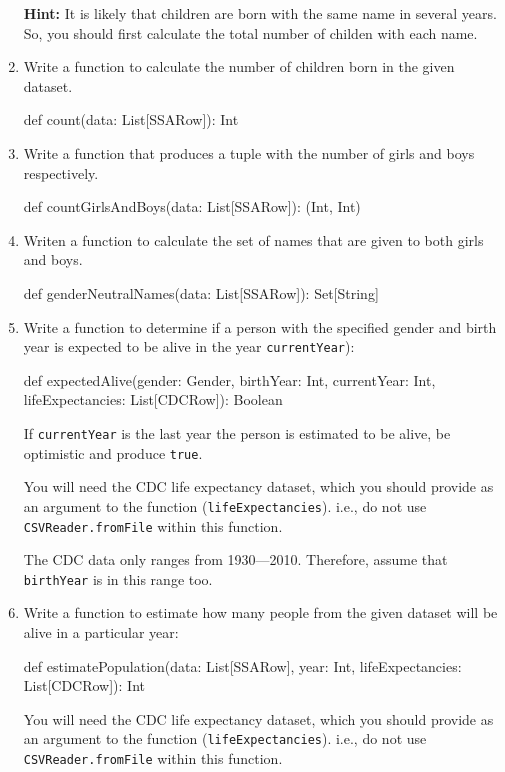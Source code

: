 \documentclass[9pt]{extbook}
\begin{document}
\begin{enumerate}
  \textbf{Hint:} It is likely that children are born with the same
      name in several years. So, you should first calculate the total
      number of childen with each name.
  
  \item Write a function to calculate the number of children born in the given dataset.
  \begin{scalacode}
  def count(data: List[SSARow]): Int
  \end{scalacode}

  \item Write a function that produces a tuple with the number of girls and boys
   respectively.
  \begin{scalacode}
  def countGirlsAndBoys(data: List[SSARow]): (Int, Int)
  \end{scalacode}

  \item Writen a function to calculate the set of names that are given to both girls and boys.
  \begin{scalacode}
  def genderNeutralNames(data: List[SSARow]): Set[String]
  \end{scalacode}


  \item Write a function to determine if a person with the specified gender and birth year
    is expected to be alive in the year  \texttt{currentYear}):

  \begin{scalacode}
  def expectedAlive(gender: Gender, birthYear: Int, currentYear: Int, lifeExpectancies: List[CDCRow]): Boolean 
  \end{scalacode}

  If \texttt{currentYear} is the last year the person is estimated to be alive, be
  optimistic and produce \texttt{true}.

  You will need the CDC life expectancy dataset, which you should provide as an
  argument to the function (\lstinline|lifeExpectancies|).
  i.e., do not use
  \lstinline|CSVReader.fromFile| within this function.

  The CDC data only ranges from 1930---2010. Therefore, assume that
    \texttt{birthYear} is in this range too.


  \item Write a function to estimate how many people from the given dataset
  will be alive in a particular year:

  \begin{scalacode}
  def estimatePopulation(data: List[SSARow], year: Int, lifeExpectancies: List[CDCRow]): Int
  \end{scalacode}

  You will need the CDC life expectancy dataset, which you should provide as an
  argument to the function (\lstinline|lifeExpectancies|). i.e., do not use
  \lstinline|CSVReader.fromFile| within this function.


\end{enumerate}
\end{document}
